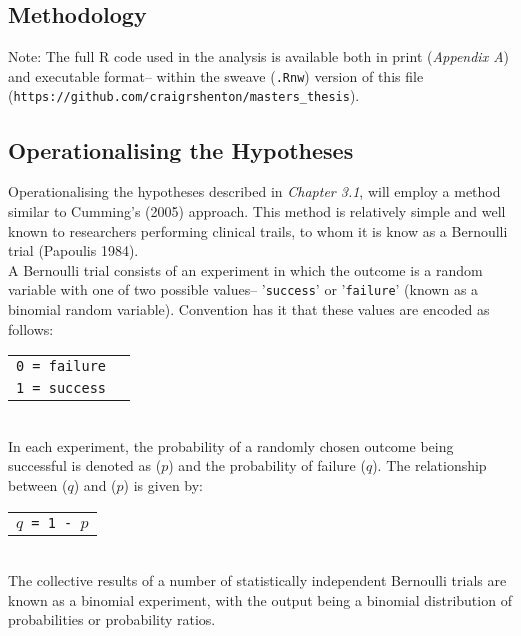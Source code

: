 \begin{spacing}{1.5}
\phantom
\phantom
\phantom
\phantom
\section{Methodology}
\phantom
\phantom
\noindent Note: The full R code used in the analysis is available both in print (\emph{Appendix A}) and executable format-- within the sweave (\texttt{.Rnw}) version of this file (\texttt{https://github.com/craigrshenton/masters\_thesis}).

\subsection{Operationalising the Hypotheses}

Operationalising the hypotheses described in \emph{Chapter 3.1}, will employ a method similar to Cumming's (2005) approach. This method is relatively simple and well known to researchers performing clinical trails, to whom it is know as a Bernoulli trial (Papoulis 1984). \\

\noindent A Bernoulli trial consists of an experiment in which the outcome is a random variable with one of two possible values-- '\texttt{success}' or '\texttt{failure}' (known as a binomial random variable). Convention has it that these values are encoded as follows: \\

\begin{tabular}{ll}
\texttt{0 = failure} \\
\texttt{1 = success} \\
\end{tabular}\\

\noindent In each experiment, the probability of a randomly chosen outcome being successful is denoted as ($p$) and the probability of failure ($q$). The relationship between ($q$) and ($p$) is given by: \\

\begin{tabular}{l}
\texttt{$q$ = 1 - $p$} \\
\end{tabular}\\

\noindent The collective results of a number of statistically independent Bernoulli trials are known as a binomial experiment, with the output being a binomial distribution of probabilities or probability ratios. \\


\end{spacing}
